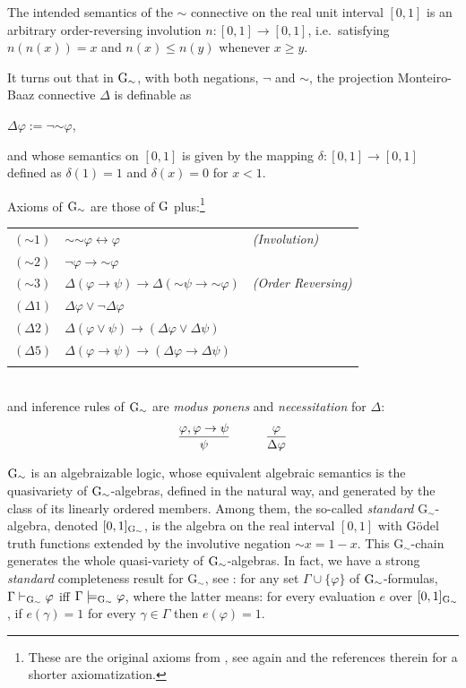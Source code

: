 \documentclass{article}
\theoremstyle{definition}
\newcommand{\ninv}{\mathord{\sim}}
\begin{document}
The {intended semantics\/}
of the $\ninv$ connective on the real unit interval $[0, 1]$ is
an arbitrary 
order-reversing involution $n:[0,1] \to [0,1]$, i.e.\ satisfying $n(n(x)) = x$ and $n(x) \le n(y)$ whenever $x \ge y$.

It turns out that in $\rm{G}_\sim$, with both
negations, $\neg$ and $\ninv$, the projection Monteiro-Baaz connective $\Delta$ is
definable as 
\begin{center}
$\Delta \varphi := \neg \ninv  \varphi$,
\end{center}
and whose semantics on $[0, 1]$ is given by the mapping $\delta: [0,1] \to [0, 1]$ defined as $\delta(1) = 1$ and $\delta(x) = 0$ for $x < 1$.

Axioms of $\rm{G}_{\ninv}$ are those of $\rm{G}$ plus:\footnote{These are the original axioms from  \cite{EsGoHaNa}, see again \cite{BeCiHa} and the references therein for a shorter axiomatization.} \\

\begin{tabular}{l l l}
$(\ninv 1)$ &$\ninv \ninv \varphi \leftrightarrow \varphi$ &
{\sl (Involution)} \\
$(\ninv 2)$ &$\neg \varphi \to \ninv \varphi$& \\
$(\ninv 3)$ &$\Delta(\varphi \to \psi) \to \Delta(\ninv \psi \to \ninv
\varphi)$
& {\sl (Order Reversing)} \\
$(\Delta 1)$ & $\Delta \varphi \vee \neg \Delta \varphi$ &\\
$(\Delta 2)$ & $\Delta (\varphi \vee \psi) \to (\Delta \varphi \vee \Delta
\psi)$&
\\
$(\Delta 5)$ & $\Delta (\varphi \to \psi) \to (\Delta \varphi \to \Delta
\psi)$&
\\ \\
\end{tabular}
\ \\
and inference rules of $\rm{G}_{\ninv}$ are  {\em modus ponens\/} and {\em necessitation\/} for $\Delta$:
$$\frac{\varphi, \varphi \to \psi}{\psi} \hspace*{1cm} \frac{\varphi}{\Delta \varphi}$$


$\rm{G}_{\ninv}$ is an algebraizable logic, whose equivalent algebraic semantics is the quasivariety of $\rm{G}_{\ninv}$-algebras, defined in the natural way, and generated by the class of its linearly ordered members. Among them, the so-called {\em standard} G$_{\ninv}$-algebra, denoted $[0, 1]_{\rm{G}_\sim}$, is the algebra on the real
interval $[0, 1]$ with G\"{o}del truth functions extended by the involutive negation $\ninv x = 1 - x$. This G$_{\ninv}$-chain generates the whole quasi-variety of $\rm{G}_{\ninv}$-algebras. In fact, we have a strong {\em standard} completeness result for G$_{\ninv}$, see \cite{EsGoHaNa,EsGoMa}: for any set $\Gamma \cup \{\varphi\}$ of $\rm{G}_{\ninv}$-formulas, $\Gamma \vdash_{\rm{G}_{\ninv}} \varphi$ iff $\Gamma \models_{\rm{G}_{\ninv}} \varphi$, where the latter means: for every evaluation $e$ over $[0, 1]_{\rm{G}_\sim}$, if $e(\gamma) =1$ for every $\gamma \in \Gamma$ then $e(\varphi)=1$.
\end{document}
